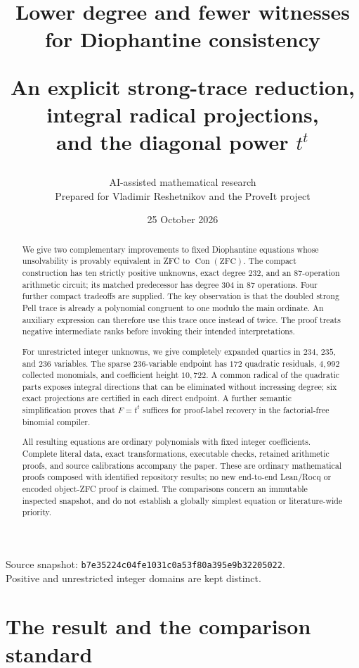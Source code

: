 \documentclass[11pt]{article}
\title{\color{ink}\bfseries Lower degree and fewer witnesses\\for Diophantine consistency\par\large An explicit strong-trace reduction, integral radical projections,\\and the diagonal power $t^t$}
\author{AI-assisted mathematical research\\\normalsize Prepared for Vladimir Reshetnikov and the ProveIt project}
\date{25 October 2026}
\theoremstyle{definition}
\newcommand{\Con}{\operatorname{Con}}\newcommand{\lcm}{\operatorname{lcm}}
\begin{document}
\maketitle\thispagestyle{empty}
\begin{abstract}
We give two complementary improvements to fixed Diophantine equations whose
unsolvability is provably equivalent in ZFC to $\Con(\mathrm{ZFC})$.
The compact construction has ten strictly positive unknowns, exact degree
$232$, and an $87$-operation arithmetic circuit; its matched predecessor
has degree $304$ in $87$ operations. Four further compact tradeoffs are
supplied. The key observation is that the doubled strong Pell trace is
already a polynomial congruent to one modulo the main ordinate. An
auxiliary expression can therefore use this trace once instead of twice.
The proof treats negative intermediate ranks before invoking their
intended interpretations.

For unrestricted integer unknowns, we give completely expanded quartics
in $234$, $235$, and $236$ variables. The sparse $236$-variable endpoint
has $172$ quadratic residuals, $4{,}992$ collected monomials, and coefficient
height $10{,}722$. A common radical of the quadratic parts exposes
integral directions that can be eliminated without increasing degree;
six exact projections are certified in each direct endpoint. A further
semantic simplification proves that $F=t^t$ suffices for proof-label
recovery in the factorial-free binomial compiler.

All resulting equations are ordinary polynomials with fixed integer
coefficients. Complete literal data, exact transformations, executable
checks, retained arithmetic proofs, and source calibrations accompany the
paper. These are ordinary mathematical proofs composed with identified
repository results; no new end-to-end Lean/Rocq or encoded object-ZFC proof
is claimed. The comparisons concern an immutable inspected snapshot,
and do not establish a globally simplest equation or literature-wide priority.
\end{abstract}
\vfill
\begin{center}\small
Source snapshot: \texttt{b7e35224c04fe1031c0a53f80a395e9b32205022}.\\
Positive and unrestricted integer domains are kept distinct.
\end{center}
\newpage\tableofcontents\newpage

\section{The result and the comparison standard}
\end{document}
